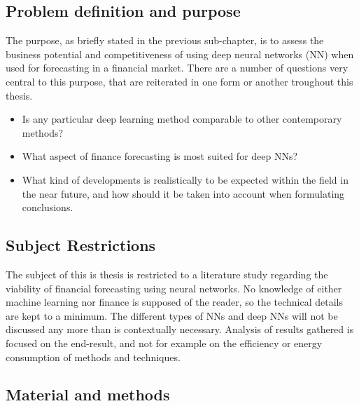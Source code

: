 \subsection{Problem definition and purpose}

The purpose, as briefly stated in the previous sub-chapter, is to assess the business potential and competitiveness of using deep neural networks (NN) when used for forecasting in a financial market. There are a number of questions very central to this purpose, that are reiterated in one form or another troughout this thesis.

\begin{itemize}

\item Is any particular deep learning method comparable to other contemporary methods?

\item What aspect of finance forecasting is most suited for deep NNs?

\item What kind of developments is realistically to be expected within the field in the near future, and how should it be taken into account when formulating conclusions.

\end{itemize}




\subsection{Subject Restrictions}

The subject of this is thesis is restricted to a literature study regarding the viability of financial forecasting using neural networks. No knowledge of either machine learning nor finance is supposed of the reader, so the technical details are kept to a minimum.
The different types of NNs and deep NNs will not be discussed any more than is contextually necessary.
Analysis of results gathered is focused on the end-result, and not for example on the efficiency or energy consumption of methods and techniques.




\subsection{Material and methods}

